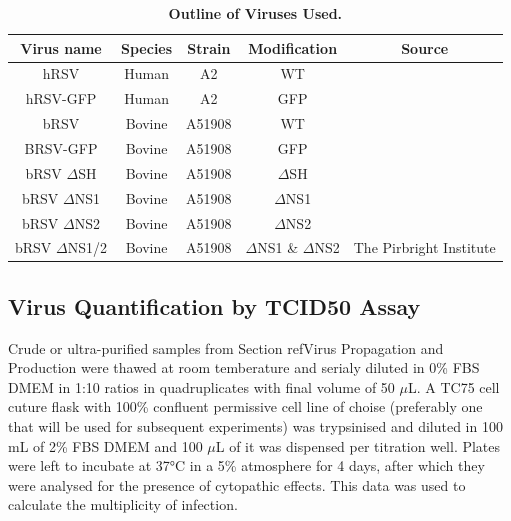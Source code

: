 \begin{table}
\centering
\begin{tabular}{ccccc}
\hline
{\textbf{Virus name}} &
  {\textbf{Species}} &
  { \textbf{Strain}} &
  { \textbf{Modification}} &
  { \textbf{Source}} \\ \hline
hRSV      & Human  & A2     & WT   &  \\ \cline{1-4}
hRSV-GFP  & Human  & A2     & GFP  &  \\ \cline{1-4}
bRSV      & Bovine & A51908 & WT   &  \\ \cline{1-4}
BRSV-GFP  & Bovine & A51908 & GFP  &  \\ \cline{1-4}
bRSV \(\Delta\)SH  & Bovine & A51908 & \(\Delta\)SH  &  \\ \cline{1-4}
bRSV \(\Delta\)NS1 & Bovine & A51908 & \(\Delta\)NS1 &  \\ \cline{1-4}
bRSV \(\Delta\)NS2 & Bovine & A51908 & \(\Delta\)NS2 &  \\ \cline{1-4}
bRSV \(\Delta\)NS1/2 &
  Bovine &
  A51908 &
  \(\Delta\)NS1 \& \(\Delta\)NS2 &
  \multirow{-8}{*}{The Pirbright Institute} \\ \hline
\end{tabular}
\caption[Outline of Viruses Used.]{\textbf{Outline of Viruses Used.}}
\label{tab:Outline of Viruses Used table}
\end{table}




\subsection{Virus Quantification by TCID50 Assay} \label{subsec:Virus Quantification by TCID50 Assay}
Crude or ultra-purified samples from Section ref{Virus Propagation and Production} were thawed at room temberature and serialy diluted in 0\% FBS DMEM in 1:10 ratios in quadruplicates with final volume of 50 \(\mu\)L. A TC75 cell cuture flask with 100\% confluent permissive cell line of choise (preferably one that will be used for subsequent experiments) was trypsinised and diluted in 100 mL of 2\% FBS DMEM and 100 \(\mu\)L of it was dispensed per titration well. Plates were left to incubate at 37°C in a 5\%  atmosphere for 4 days, after which they were analysed for the presence of cytopathic effects. This data was used to calculate the multiplicity of infection.




